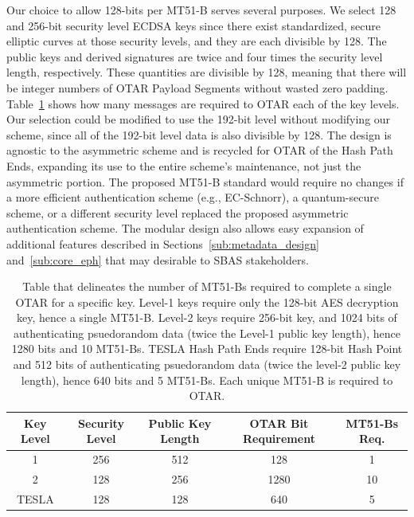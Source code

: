 \documentclass[letterpaper,times]{IONconf/IONconf}
\begin{document}
	Our choice to allow 128-bits per MT51-B serves several purposes.
	We select 128 and 256-bit security level ECDSA keys since there exist standardized, secure elliptic curves at those security levels, and they are each divisible by 128.
	The public keys and derived signatures are twice and four times the security level length, respectively.
	These quantities are divisible by 128, meaning that there will be integer numbers of OTAR Payload Segments without wasted zero padding.
	Table~\ref{tab: psuedorandom lengths} shows how many messages are required to OTAR each of the key levels.
	Our selection could be modified to use the 192-bit level without modifying our scheme, since all of the 192-bit level data is also divisible by 128.
	The design is agnostic to the asymmetric scheme and is recycled for OTAR of the Hash Path Ends, expanding its use to the entire scheme's maintenance, not just the asymmetric portion.
	The proposed MT51-B standard would require no changes if a more efficient authentication scheme (e.g., EC-Schnorr), a quantum-secure scheme, or a different security level replaced the proposed asymmetric authentication scheme.
	The modular design also allows easy expansion of additional features described in Sections~\ref{sub:metadata_design} and~\ref{sub:core_eph} that may desirable to SBAS stakeholders.
		\begin{table}[H]
		\center
		\begin{tabular}{|c|c|c|c|c|} \hline
			Key Level & Security Level & Public Key Length & OTAR Bit Requirement & MT51-Bs Req. \\ \hline
			    1 & 256 & 512 &  128 & 1 \\ \hline
			    2 & 128 & 256 & 1280 & 10\\ \hline
			TESLA & 128 & 128 &  640 & 5 \\ \hline
		\end{tabular}
		\caption{Table that delineates the number of MT51-Bs required to complete a single OTAR for a specific key. Level-1 keys require only the 128-bit AES decryption key, hence a single MT51-B. Level-2 keys require 256-bit key, and 1024 bits of authenticating psuedorandom data (twice the Level-1 public key length), hence 1280 bits and 10 MT51-Bs. TESLA Hash Path Ends require 128-bit Hash Point and 512 bits of authenticating psuedorandom data (twice the level-2 public key length), hence 640 bits and 5 MT51-Bs. Each unique MT51-B is required to OTAR.}
		\label{tab: psuedorandom lengths}
	\end{table}
\end{document}
